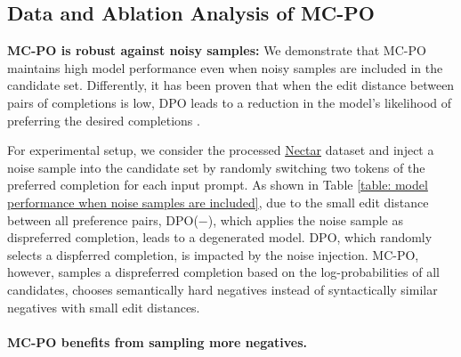 \subsection{Data and Ablation Analysis of MC-PO}
\label{sec:expdata}

\textbf{MC-PO is robust against noisy samples: }
We demonstrate that MC-PO maintains high model performance even when noisy samples are included in the candidate set. 
Differently, it has been proven that when the edit distance between pairs of completions is low, DPO leads to a reduction in the model’s likelihood of preferring the desired completions \citep{pal2024smaug}. 

For experimental setup, we consider the processed \href{https://huggingface.co/datasets/berkeley-nest/Nectar}{Nectar} dataset and inject a noise sample into the candidate set by randomly switching two tokens of the preferred completion for each input prompt. 
As shown in Table \ref{table: model performance when noise samples are included},
due to the small edit distance between all preference pairs, DPO($-$), which applies the noise sample as dispreferred completion, leads to a degenerated model. 
DPO, which randomly selects a dispferred completion, is impacted by the noise injection.
MC-PO, however,  samples a dispreferred completion based on the log-probabilities of all candidates, chooses semantically hard negatives instead of syntactically similar negatives with small edit distances.






\paragraph{MC-PO benefits from sampling more negatives.}





